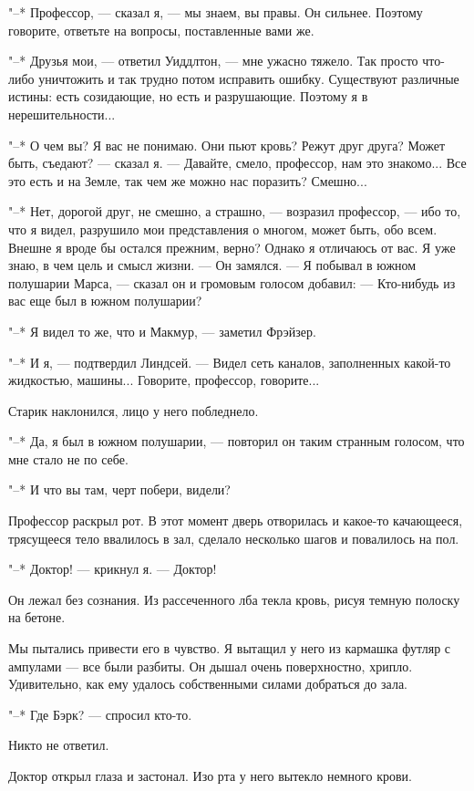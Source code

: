 "--* Профессор, --- сказал я, --- мы знаем,  вы  правы.  Он  сильнее.  Поэтому
говорите, ответьте на вопросы, поставленные вами же.

"--* Друзья мои, --- ответил Уиддлтон,  ---  мне  ужасно  тяжело.  Так  просто
что-либо уничтожить  и  так  трудно  потом  исправить  ошибку.  Существуют
различные истины: есть созидающие, но есть  и  разрушающие.  Поэтому  я  в
нерешительности...

"--* О чем вы? Я вас не понимаю. Они пьют кровь? Режут друг  друга?  Может
быть, съедают? --- сказал я. --- Давайте, смело, профессор, нам это знакомо...
Все это есть и на Земле, так чем же можно нас поразить? Смешно...

"--* Нет, дорогой друг, не смешно, а страшно, --- возразил профессор, ---  ибо
то, что я видел, разрушило мои представления о  многом,  может  быть,  обо
всем. Внешне я вроде бы остался прежним, верно? Однако я отличаюсь от вас.
Я уже знаю, в чем цель и смысл жизни. --- Он замялся. --- Я  побывал  в  южном
полушарии Марса, --- сказал он и громовым голосом добавил: ---  Кто-нибудь  из
вас еще был в южном полушарии?

"--* Я видел то же, что и Макмур, --- заметил Фрэйзер.

"--* И я, --- подтвердил Линдсей. --- Видел сеть каналов, заполненных какой-то
жидкостью, машины... Говорите, профессор, говорите...

Старик наклонился, лицо у него побледнело.

"--* Да, я был в южном полушарии, --- повторил он  таким  странным  голосом,
что мне стало не по себе.

"--* И что вы там, черт побери, видели?

Профессор раскрыл рот.  В  этот  момент  дверь  отворилась  и  какое-то
качающееся, трясущееся тело ввалилось в зал,  сделало  несколько  шагов  и
повалилось на пол.

"--* Доктор! --- крикнул я. --- Доктор!

Он лежал без сознания. Из рассеченного лба текла  кровь,  рисуя  темную
полоску на бетоне.

Мы пытались привести его в чувство. Я вытащил у него из кармашка футляр
с ампулами --- все  были  разбиты.  Он  дышал  очень  поверхностно,  хрипло.
Удивительно, как ему удалось собственными силами добраться до зала.

"--* Где Бэрк? --- спросил кто-то.

Никто не ответил.

Доктор открыл глаза и застонал. Изо рта у него вытекло немного крови.


